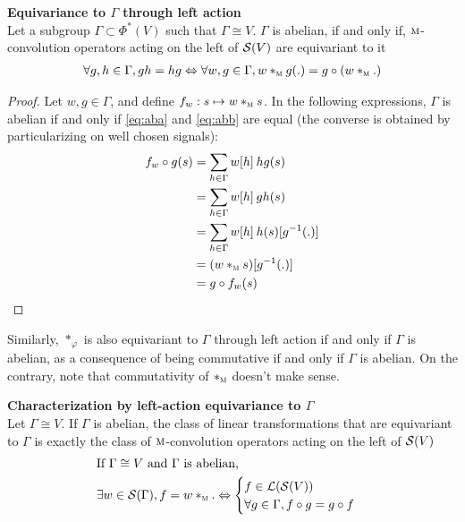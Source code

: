 \begin{proposition}\textbf{Equivariance to $\Gamma$ through left action}\\
Let a subgroup $\Gamma \subset \Phi^*(V)$ such that $\Gamma \cong V$. $\Gamma$ is abelian, if and only if, $\M$-convolution operators acting on the left of $\cs(V)$ are equivariant to it \ie
\begin{gather*}
\forall g,h \in \Gamma, gh = hg \Leftrightarrow \forall w, g \in \Gamma, w \ast_{\M} g(.) = g \circ (w \ast_{\M} .) 
\end{gather*}
\end{proposition}

\begin{proof}
Let $w, g \in \Gamma$, and define $f_w: s \mapsto w \ast_{\M} s$. In the following expressions, $\Gamma$ is abelian if and only if \eqref{eq:aba} and \eqref{eq:abb} are equal (the converse is obtained by particularizing on well chosen signals):
\begin{align}
f_w \circ g (s) & = \displaystyle \sum_{h \in \Gamma} w[h] \h{2} hg(s) \label{eq:aba}\\
 & = \displaystyle \sum_{h \in \Gamma} w[h] \h{2} gh(s) \label{eq:abb}\\
 & = \displaystyle \sum_{h \in \Gamma} w[h] \h{2} h(s)[g^{-1}(.)] \nn\\
 & = (w \ast_{\M} s )[g^{-1}(.)] \nn\\
 & = g \circ f_w (s) \nn
\end{align}
\end{proof}

\begin{remark}Similarly, $\ast_{\varphi}$ is also equivariant to $\Gamma$ through left action if and only if $\Gamma$ is abelian, as a consequence of being commutative if and only if $\Gamma$ is abelian. On the contrary, note that commutativity of $\ast_{\M}$ doesn't make sense.
\end{remark}

\begin{corrolary}\textbf{Characterization by left-action equivariance to $\Gamma$}\\
Let $\Gamma \cong V$. If $\Gamma$ is abelian, the class of linear transformations that are equivariant to $\Gamma$ is exactly the class of $\M$-convolution operators acting on the left of $\cs(V)$ \ie
\begin{align*}
& \text{If } \Gamma \cong V \text{ and $\Gamma$ is abelian,}\\
& \exists w \in \cs(\Gamma), f = w \ast_{\M} . \Leftrightarrow
\begin{cases}
f \in \cl(\cs(V))\\
\forall g \in \Gamma, f \circ g = g \circ f
\end{cases}
\end{align*}
\end{corrolary}

